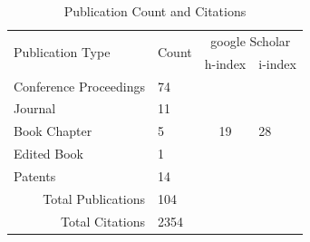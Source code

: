 \documentclass[12pt,letterpaper]{report}
\begin{document}
\begin{table}[]
\caption{Publication Count and Citations
}
\label{tab:pubs}
\center
\begin{tabular}{llcl}
\hline
\multicolumn{1}{|l|}{\multirow{2}{*}{Publication Type}} & \multicolumn{1}{c|}{\multirow{2}{*}{Count}} & \multicolumn{2}{c|}{google Scholar}                                                 \\ \cline{3-4} 
\multicolumn{1}{|l|}{}                                  & \multicolumn{1}{c|}{}                       & \multicolumn{1}{c|}{h-index}             & \multicolumn{1}{l|}{i-index}             \\ \hline
\multicolumn{1}{|l|}{Conference Proceedings}            & \multicolumn{1}{l|}{74}                     & \multicolumn{1}{c|}{\multirow{5}{*}{19}} & \multicolumn{1}{l|}{\multirow{5}{*}{28}} \\ \cline{1-2}
\multicolumn{1}{|l|}{Journal}                           & \multicolumn{1}{l|}{11}                     & \multicolumn{1}{c|}{}                    & \multicolumn{1}{l|}{}                    \\ \cline{1-2}
\multicolumn{1}{|l|}{Book Chapter}                      & \multicolumn{1}{l|}{5}                      & \multicolumn{1}{c|}{}                    & \multicolumn{1}{l|}{}                    \\ \cline{1-2}
\multicolumn{1}{|l|}{Edited Book}                       & \multicolumn{1}{l|}{1}                      & \multicolumn{1}{c|}{}                    & \multicolumn{1}{l|}{}                    \\ \cline{1-2}
\multicolumn{1}{|l|}{Patents}                           & \multicolumn{1}{l|}{14}                     & \multicolumn{1}{c|}{}                    & \multicolumn{1}{l|}{}                    \\ \hline
\multicolumn{1}{r}{Total Publications}                  & 104                                         & \multicolumn{1}{l}{}                     &                                          \\
\multicolumn{1}{r}{Total Citations}                     & 2354                                        & \multicolumn{1}{l}{}                     &                                         
\end{tabular}
\end{table}

\end{document}
